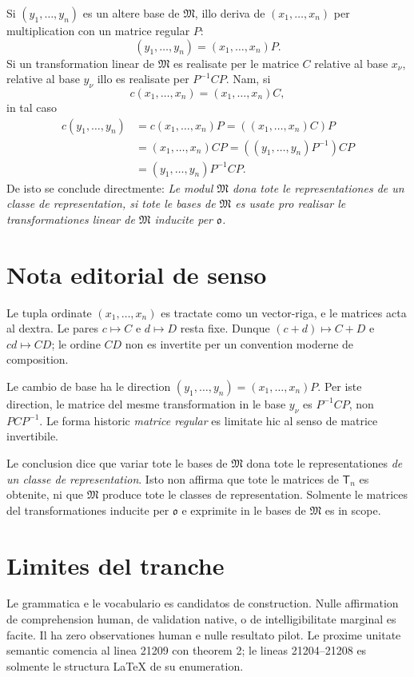 \documentclass[11pt]{article}
\begin{document}
\clearpage
\vspace*{10mm}
Si $(y_1,\ldots,y_n)$ es un altere base de $\mathfrak M$, illo deriva de $(x_1,\ldots,x_n)$ per multiplication con un matrice regular $P$:
\[
(y_1,\ldots,y_n)=(x_1,\ldots,x_n)P.
\]
Si un transformation linear de $\mathfrak M$ es realisate per le matrice $C$ relative al base $x_\nu$, relative al base $y_\nu$ illo es realisate per $P^{-1}CP$. Nam, si
\[
c(x_1,\ldots,x_n)=(x_1,\ldots,x_n)C,
\]
in tal caso
\[
\begin{aligned}
c(y_1,\ldots,y_n)
&=c(x_1,\ldots,x_n)P=((x_1,\ldots,x_n)C)P\\
&=(x_1,\ldots,x_n)CP=((y_1,\ldots,y_n)P^{-1})CP\\
&=(y_1,\ldots,y_n)P^{-1}CP.
\end{aligned}
\]
De isto se conclude directmente:
\emph{Le modul $\mathfrak M$ dona tote le representationes de un classe de representation, si tote le bases de $\mathfrak M$ es usate pro realisar le transformationes linear de $\mathfrak M$ inducite per $\mathfrak{o}$.}

\clearpage
\vspace*{10mm}
\section*{Nota editorial de senso}

Le tupla ordinate $(x_1,\ldots,x_n)$ es tractate como un vector-riga, e le matrices acta al dextra. Le pares $c\mapsto C$ e $d\mapsto D$ resta fixe. Dunque $(c+d)\mapsto C+D$ e $cd\mapsto CD$; le ordine $CD$ non es invertite per un convention moderne de composition.

Le cambio de base ha le direction $(y_1,\ldots,y_n)=(x_1,\ldots,x_n)P$. Per iste direction, le matrice del mesme transformation in le base $y_\nu$ es $P^{-1}CP$, non $PCP^{-1}$. Le forma historic \emph{matrice regular} es limitate hic al senso de matrice invertibile.

Le conclusion dice que variar tote le bases de $\mathfrak M$ dona tote le representationes \emph{de un classe de representation}. Isto non affirma que tote le matrices de $\mathsf T_n$ es obtenite, ni que $\mathfrak M$ produce tote le classes de representation. Solmente le matrices del transformationes inducite per $\mathfrak{o}$ e exprimite in le bases de $\mathfrak M$ es in scope.

\section*{Limites del tranche}

Le grammatica e le vocabulario es candidatos de construction. Nulle affirmation de comprehension human, de validation native, o de intelligibilitate marginal es facite. Il ha zero observationes human e nulle resultato pilot. Le proxime unitate semantic comencia al linea 21209 con theorem 2; le lineas 21204--21208 es solmente le structura \LaTeX{} de su enumeration.
\end{document}
